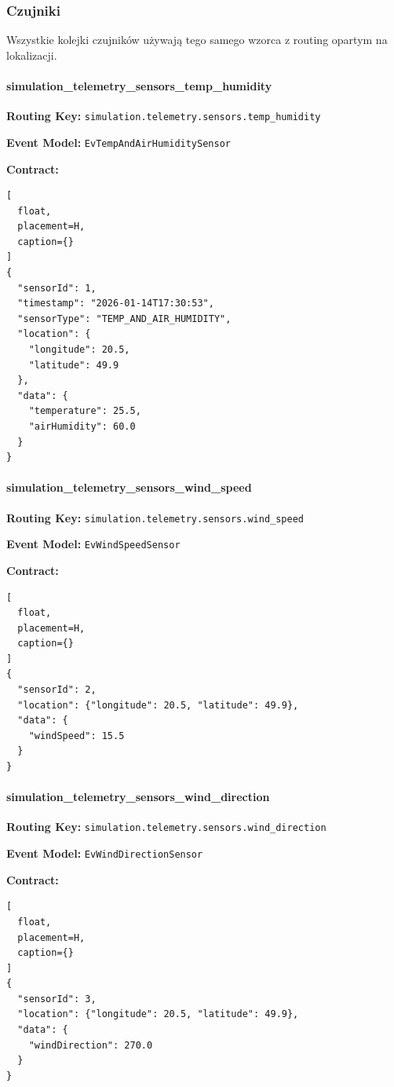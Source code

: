 \subsubsection{Czujniki}

Wszystkie kolejki czujników używają tego samego wzorca z routing opartym na lokalizacji.

\paragraph{simulation\_telemetry\_sensors\_temp\_humidity}

\textbf{Routing Key:} \texttt{simulation.telemetry.sensors.temp\_humidity}

\textbf{Event Model:} \texttt{EvTempAndAirHumiditySensor}

\textbf{Contract:}
\begin{lstlisting}[
  float,
  placement=H,
  caption={}
] 
{
  "sensorId": 1,
  "timestamp": "2026-01-14T17:30:53",
  "sensorType": "TEMP_AND_AIR_HUMIDITY",
  "location": {
    "longitude": 20.5,
    "latitude": 49.9
  },
  "data": {
    "temperature": 25.5,
    "airHumidity": 60.0
  }
}
\end{lstlisting}

\paragraph{simulation\_telemetry\_sensors\_wind\_speed}

\textbf{Routing Key:} \texttt{simulation.telemetry.sensors.wind\_speed}

\textbf{Event Model:} \texttt{EvWindSpeedSensor}

\textbf{Contract:}
\begin{lstlisting}[
  float,
  placement=H,
  caption={}
]
{
  "sensorId": 2,
  "location": {"longitude": 20.5, "latitude": 49.9},
  "data": {
    "windSpeed": 15.5
  }
}
\end{lstlisting}

\paragraph{simulation\_telemetry\_sensors\_wind\_direction}

\textbf{Routing Key:} \texttt{simulation.telemetry.sensors.wind\_direction}

\textbf{Event Model:} \texttt{EvWindDirectionSensor}

\textbf{Contract:}
\begin{lstlisting}[
  float,
  placement=H,
  caption={}
]
{
  "sensorId": 3,
  "location": {"longitude": 20.5, "latitude": 49.9},
  "data": {
    "windDirection": 270.0
  }
}
\end{lstlisting}

